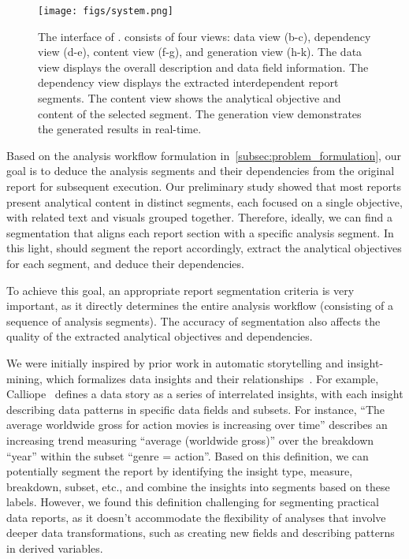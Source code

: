 \begin{figure*}[!htb] 
  \centering
  \texttt{[image: figs/system.png]}
  \caption{
  The interface of \system{}. 
  \system{} consists of four views: data view (b-c), dependency view (d-e), content view (f-g), and generation view (h-k). 
  The data view displays the overall description and data field information. 
  The dependency view displays the extracted interdependent report segments. 
  The content view shows the analytical objective and content of the selected segment. 
  The generation view demonstrates the generated results in real-time. 
  }
  \label{fig:interface}
\end{figure*}

Based on the analysis workflow formulation in~\autoref{subsec:problem_formulation}, our goal is to deduce the analysis segments and their dependencies from the original report for subsequent execution. 
Our preliminary study showed that most reports present analytical content in distinct segments, each focused on a single objective, with related text and visuals grouped together. 
Therefore, ideally, we can find a segmentation that aligns each report section with a specific analysis segment. 
In this light, \system{} should segment the report accordingly, extract the analytical objectives for each segment, and deduce their dependencies.

To achieve this goal, an appropriate report segmentation criteria is very important, as it directly determines the entire analysis workflow (consisting of a sequence of analysis segments). 
The accuracy of segmentation also affects the quality of the extracted analytical objectives and dependencies.

We were initially inspired by prior work in automatic storytelling and insight-mining, which formalizes data insights and their relationships~\cite{ma2023insightpilot, wang2019datashot}. 
For example, Calliope~\cite{shi2020calliope} defines a data story as a series of interrelated insights, with each insight describing data patterns in specific data fields and subsets. 
For instance, ``The average worldwide gross for action movies is increasing over time'' describes an increasing trend measuring ``average (worldwide gross)'' over the breakdown ``year'' within the subset ``genre = action''. 
Based on this definition, we can potentially segment the report by identifying the insight type, measure, breakdown, subset, etc., and combine the insights into segments based on these labels. 
However, we found this definition challenging for segmenting practical data reports, as it doesn't accommodate the flexibility of analyses that involve deeper data transformations, such as creating new fields and describing patterns in derived variables.

